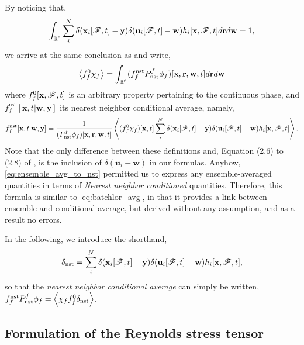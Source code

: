 By noticing that, 
\begin{equation}
    \int_{\mathbb{R}^6}
    \sum_i^N 
    \delta(\textbf{x}_i[\mathscr{F},t]-\textbf{y})
    \delta(\textbf{u}_i[\mathscr{F},t]-\textbf{w})
    h_i[\textbf{x},\mathscr{F},t]
    d\textbf{r}
    d\textbf{w} 
    =1,
\end{equation}
we arrive at the same conclusion as \citet{zhang2021ensemble} and write, 
\begin{equation}
    \avg{f_f^0\chi_f}
    = 
    \int_{\mathbb{R}^6}
    (f_f^\text{nst}P_\text{nst}^f\phi_f)[\textbf{x},\textbf{r},\textbf{w},t]
    d\textbf{r}
    d\textbf{w}
    \label{eq:ensemble_avg_to_nst}
\end{equation} 
where $f_f^0[\textbf{x},\mathscr{F},t]$ is an arbitrary property pertaining to the continuous phase, and $f_f^\text{nst}[\textbf{x},t|\textbf{w},\textbf{y}]$ its nearest neighbor conditional average, namely, 
\begin{equation}
    f_f^\text{nst}[\textbf{x},t|\textbf{w},\textbf{y}]
    =\frac{1}{(P_\text{nst}^f\phi_f) [\textbf{x},\textbf{r},\textbf{w},t]}
    \avg{
        (f_f^0
        \chi_f)[\textbf{x},t]
        \sum_i^N 
        \delta(\textbf{x}_i[\FF,t]-\textbf{y})
        \delta(\textbf{u}_i[\FF,t]-\textbf{w})
        h_i[\textbf{x},\FF,t]
    }.
    \label{eq:def_f_nst}
\end{equation}
Note that the only difference between these definitions and, Equation (2.6) to (2.8) of \citet{zhang2021ensemble}, is the inclusion of $\delta(\textbf{u}_i - \textbf{w})$ in our formulas. 
Anyhow, \ref{eq:ensemble_avg_to_nst} permitted us to express any ensemble-averaged quantities in terms of \textit{Nearest neighbor conditioned} quantities. 
Therefore, this formula is similar to \ref{eq:batchlor_avg}, in that it provides a link between ensemble and conditional average, but derived without any assumption, and as a result no errors. 

In the following, we introduce the shorthand, 
\begin{equation*}
    \delta_\text{nst}
    =
    \sum_i^N 
    \delta(\textbf{x}_i[\FF,t]-\textbf{y})
    \delta(\textbf{u}_i[\FF,t]-\textbf{w})
    h_i[\textbf{x},\FF,t],
    \label{eq:def_delta_nst}
\end{equation*}
so that the \textit{nearest neighbor  conditional  average} can simply be written, $f_f^\text{nst} P_\text{nst}^f \phi_f = \left<\chi_f f_f^0 \delta_\text{nst}\right>$.

\subsection{Formulation of the Reynolds stress tensor}

